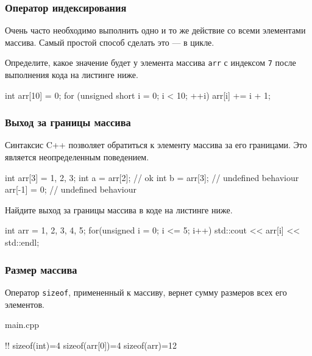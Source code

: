 \documentclass[compress, 8pt]{beamer}
\begin{document}
\begin{frame}[fragile]

    \frametitle{Оператор индексирования}

    Очень часто необходимо выполнить одно и то же действие
    со всеми элементами массива.
    Самый простой способ сделать это --- в цикле.

    \begin{task}
        Определите, какое значение будет у элемента массива \verb|arr|
        с индексом \verb|7| после выполнения кода на листинге ниже.
    \end{task}

    \begin{myinplacelisting}[minted language=cpp]
int arr[10] = {0};
for (unsigned short i = 0; i < 10; ++i) {
    arr[i] += i + 1;
}
    \end{myinplacelisting}

\end{frame}

\begin{frame}[fragile]

    \frametitle{Выход за границы массива}

    Синтаксис C++ позволяет обратиться к элементу массива за его
    границами.
    Это является неопределенным поведением\footnotemark{}.


    \begin{myinplacelisting}[minted language=cpp]
int arr[3] = {1, 2, 3};
int a = arr[2]; // ok
int b = arr[3]; // undefined behaviour
arr[-1] = 0; // undefined behaviour
    \end{myinplacelisting}

    \begin{task}
        Найдите выход за границы массива в коде на листинге ниже.
    \end{task}

    \begin{myinplacelisting}[minted language=cpp]
int arr = {1, 2, 3, 4, 5};
for(unsigned i = 0; i <= 5; i++) {
    std::cout << arr[i] << std::endl;
}
    \end{myinplacelisting}

\end{frame}

\begin{frame}[fragile]

    \frametitle{Размер массива}

    \hfill \break
    \hfill \break
    Оператор \verb|sizeof|, примененный к массиву, вернет сумму размеров
    всех его элементов.

        {main.cpp}

    \begin{terminalwindow}
!!
sizeof(int)=4
sizeof(arr[0])=4
sizeof(arr)=12
    \end{terminalwindow}

\end{frame}
\end{document}
